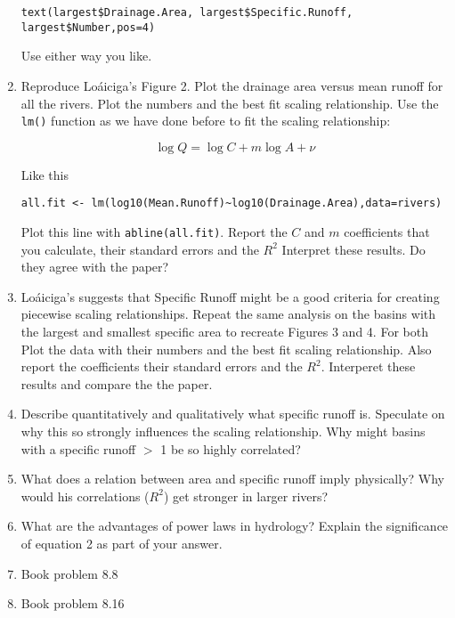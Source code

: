 \documentclass[11pt]{article}
\begin{document}
\begin{enumerate}
\begin{verbatim}
text(largest$Drainage.Area, largest$Specific.Runoff, largest$Number,pos=4)
\end{verbatim}

Use either way you like. 

\item Reproduce Lo\'aiciga's Figure 2.  Plot the drainage area versus mean runoff for all the rivers. Plot the numbers and the best fit scaling relationship.  Use the \texttt{lm()} function as we have done before to fit the scaling relationship:

$$\log Q=\log C+m\log A+\nu$$

Like this

\begin{verbatim}
all.fit <- lm(log10(Mean.Runoff)~log10(Drainage.Area),data=rivers)
\end{verbatim}

Plot this line with \texttt{abline(all.fit)}.  Report the $C$ and $m$ coefficients that you calculate, their standard errors and the $R^2$  Interpret these results. Do they agree with the paper?

\item Lo\'aiciga's suggests that Specific Runoff might be a good criteria for creating piecewise scaling relationships.  Repeat the same analysis on the basins with the largest and smallest specific area to recreate Figures 3 and 4. For both Plot the data with their numbers and the best fit scaling relationship. Also report the coefficients their standard errors and the $R^2$.  Interperet these results and compare the the paper. 

\item Describe quantitatively and qualitatively what specific runoff is. Speculate on why this so strongly influences the scaling relationship. Why might basins with a specific runoff $>$ 1 be so highly correlated?  

\item What does a relation between area and specific runoff imply physically? Why would his correlations ($R^2$) get stronger in larger rivers?

\item What are the advantages of power laws in hydrology? Explain the significance of equation 2 as part of your answer.

\item Book problem 8.8

\item Book problem 8.16

\end{enumerate}
\end{document}
